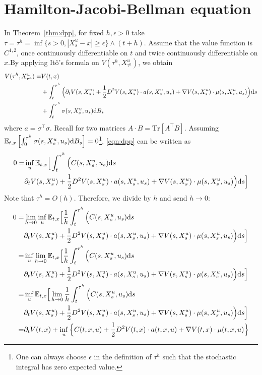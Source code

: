 \documentclass[11pt]{book}
\newcommand{\dd}{\text{\normalfont d}}
\newcommand{\ds}{\text{\normalfont d}s}
\begin{document}
\section{Hamilton-Jacobi-Bellman equation}
In Theorem~\ref{thm:dpp}, for fixed $h,\epsilon>0$ take $\tau=\tau^h=\inf\{s>0, |X_s^u-x|\ge \epsilon\}\wedge (t+h)$. Assume that the value function is $C^{1,2}$, once continuously differentiable on $t$ and twice continuously differentiable on $x$.By applying It\^o's formula on $V({\tau^h},X_{\tau^h}^u)$, we obtain
\begin{equation}
\begin{split}
    V({\tau^h},X_{\tau^h}^u)=&V(t,x)\\
    &+\int_t^{\tau^h} \Big(\partial_t V(s,X_s^u)+\frac12 D^2V(s,X_s^u) \cdot a(s,X_s^u,u_s) + \nabla V(s,X_s^u)\cdot \mu(s,X_s^u,u_s)\Big){{\ds}}\\
    &+\int_t^{\tau^h} \sigma(s,X_s^u,u_s){\dd}B_s
\end{split}
\end{equation}
where $a=\sigma^\intercal\sigma$. Recall  for two matrices $A\cdot B=\textrm{Tr}[A^\intercal B]$.  Assuming $\mathbb{E}_{t,x}\left[\int_0^{\tau^h} \sigma(s,X_s^u,u_s){\dd}B_s\right]=0$\footnote{One can always choose $\epsilon$ in the definition of ${\tau^h}$ such that the stochastic integral has zero expected value.}, \eqref{eqn:dpp} can be written as
\begin{equation}
    \begin{split}
        0 =&\inf_{u}\mathbb{E}_{t,x}\Big[\int_t^{\tau^h} \Big( C(s,X^u_s,u_s){{\ds}} \\
        & \partial_t V(s,X_s^u)+\frac12 D^2V(s,X_s^u) \cdot a(s,X_s^u,u_s) + \nabla V(s,X_s^u)\cdot \mu(s,X_s^u,u_s)\Big){{\ds}}\Big]
    \end{split}
\end{equation}
Note that ${\tau^h}=O(h)$. Therefore, we divide by $h$ and send $h\to0$:
\begin{equation}
    \begin{split}
        0 =&\lim_{h\to0}\inf_{u}\mathbb{E}_{t,x}\Big[\frac1h\int_t^{\tau^h} \Big( C(s,X^u_s,u_s){{\ds}} \\
        & \partial_t V(s,X_s^u)+\frac12 D^2V(s,X_s^u) \cdot a(s,X_s^u,u_s) + \nabla V(s,X_s^u)\cdot \mu(s,X_s^u,u_s)\Big){{\ds}}\Big]\\
        =&\inf_{u}\lim_{h\to0} \mathbb{E}_{t,x}\Big[\frac1h\int_t^{\tau^h} \Big( C(s,X^u_s,u_s){{\ds}} \\
        & \partial_t V(s,X_s^u)+\frac12 D^2V(s,X_s^u) \cdot a(s,X_s^u,u_s) + \nabla V(s,X_s^u)\cdot \mu(s,X_s^u,u_s)\Big){{\ds}}\Big]\\
        =&\inf_{u} \mathbb{E}_{t,x}\Big[\lim_{h\to0}\frac1h\int_t^{\tau^h} \Big( C(s,X^u_s,u_s){{\ds}} \\
        & \partial_t V(s,X_s^u)+\frac12 D^2V(s,X_s^u) \cdot a(s,X_s^u,u_s) + \nabla V(s,X_s^u)\cdot \mu(s,X_s^u,u_s)\Big){{\ds}}\Big]\\
        =&\partial_t V(t,x)+\inf_{u}\Big\{C(t,x,u) +
         \frac12 D^2V(t,x) \cdot a(t,x,u) + \nabla V(t,x)\cdot \mu(t,x,u)\Big\}
    \end{split}
\end{equation}
\end{document}
